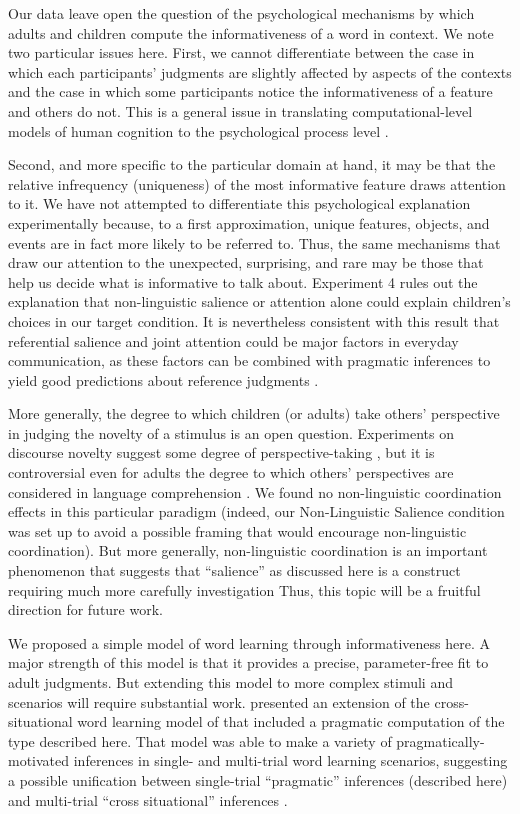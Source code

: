 \documentclass[man,noapacite]{apa2}
\begin{document}
Our data leave open the question of the psychological mechanisms by which adults and children compute the informativeness of a word in context. We note two particular issues here. First, we cannot differentiate between the case in which each participants' judgments are slightly affected by aspects of the contexts and the case in which some participants notice the informativeness of a feature and others do not. This is a general issue in translating computational-level models of human cognition to the psychological process level \cite{frankinpressb}. 

Second, and more specific to the particular domain at hand, it may be that the relative infrequency (uniqueness) of the most informative feature draws attention to it. We have not attempted to differentiate this psychological explanation experimentally because, to a first approximation, unique features, objects, and events are in fact more likely to be referred to. Thus, the same mechanisms that draw our attention to the unexpected, surprising, and rare may be those that help us decide what is informative to talk about. Experiment 4 rules out the explanation that non-linguistic salience or attention alone could explain children's choices in our target condition. It is nevertheless consistent with this result that referential salience and joint attention could be major factors in everyday communication, as these factors can be combined with pragmatic inferences to yield good predictions about reference judgments \cite{frank2012}.

More generally, the degree to which children (or adults) take others' perspective in judging the novelty of a stimulus is an open question. Experiments on discourse novelty suggest some degree of perspective-taking \cite{akhtar1996}, but it is controversial even for adults the degree to which others' perspectives are considered in language comprehension \cite{keysar2003,nadig2002,brown-schmidt2008}. We found no non-linguistic coordination effects in this particular paradigm (indeed, our Non-Linguistic Salience condition was set up to avoid a possible framing that would encourage non-linguistic coordination). But more generally, non-linguistic coordination is an important phenomenon that suggests that ``salience'' as discussed here is a construct requiring much more carefully investigation \cite{schelling1980,clark1983}  Thus, this topic will be a fruitful direction for future work. 

We proposed a simple model of word learning through informativeness here. A major strength of this model is that it provides a precise, parameter-free fit to adult judgments. But extending this model to more complex stimuli and scenarios will require substantial work.  presented an extension of the cross-situational word learning model of  that included a pragmatic computation of the type described here. That model was able to make a variety of pragmatically-motivated inferences in single- and multi-trial word learning scenarios, suggesting a possible unification between single-trial ``pragmatic'' inferences (described here) and multi-trial ``cross situational'' inferences \cite{yu2007b,frank2009}. 
\end{document}
